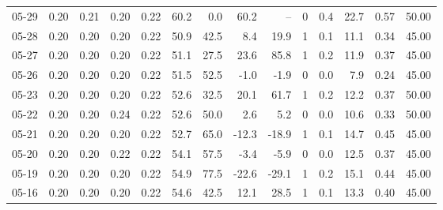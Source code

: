 \begin{threeparttable}
{\begin{tabular}{lrrrrrrrrrrrrr}
  05-29 &          0.20 &          0.21 &          0.20 &        0.22 &                60.2 &                 0.0 &       60.2 &           -- &              0 &                 0.4 &             22.7 &            0.57 &                  50.00 \\
  05-28 &          0.20 &          0.20 &          0.20 &        0.22 &                50.9 &                42.5 &        8.4 &         19.9 &              1 &                 0.1 &             11.1 &            0.34 &                  45.00 \\
  05-27 &          0.20 &          0.20 &          0.20 &        0.22 &                51.1 &                27.5 &       23.6 &         85.8 &              1 &                 0.2 &             11.9 &            0.37 &                  45.00 \\
  05-26 &          0.20 &          0.20 &          0.20 &        0.22 &                51.5 &                52.5 &       -1.0 &         -1.9 &              0 &                 0.0 &              7.9 &            0.24 &                  45.00 \\
  05-23 &          0.20 &          0.20 &          0.20 &        0.22 &                52.6 &                32.5 &       20.1 &         61.7 &              1 &                 0.2 &             12.2 &            0.37 &                  50.00 \\
  05-22 &          0.20 &          0.20 &          0.24 &        0.22 &                52.6 &                50.0 &        2.6 &          5.2 &              0 &                 0.0 &             10.6 &            0.33 &                  50.00 \\
  05-21 &          0.20 &          0.20 &          0.20 &        0.22 &                52.7 &                65.0 &      -12.3 &        -18.9 &              1 &                 0.1 &             14.7 &            0.45 &                  45.00 \\
  05-20 &          0.20 &          0.20 &          0.22 &        0.22 &                54.1 &                57.5 &       -3.4 &         -5.9 &              0 &                 0.0 &             12.5 &            0.37 &                  45.00 \\
  05-19 &          0.20 &          0.20 &          0.20 &        0.22 &                54.9 &                77.5 &      -22.6 &        -29.1 &              1 &                 0.2 &             15.1 &            0.44 &                  45.00 \\
  05-16 &          0.20 &          0.20 &          0.20 &        0.22 &                54.6 &                42.5 &       12.1 &         28.5 &              1 &                 0.1 &             13.3 &            0.40 &                  45.00 \\

\end{tabular}}
\end{threeparttable}
